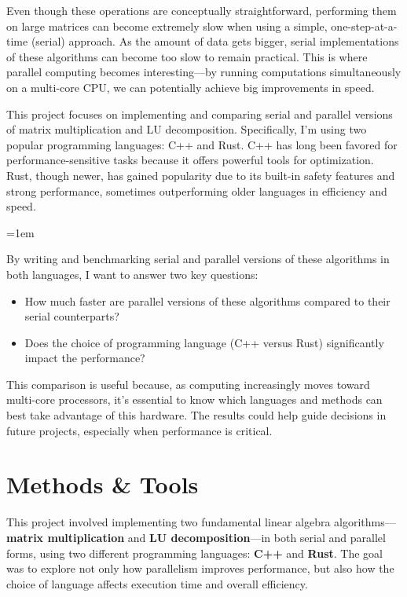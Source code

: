 \documentclass[12pt]{article}
\begin{document}
\vspace{1em}

Even though these operations are conceptually straightforward, performing them on large matrices can become extremely slow when using a simple,
one-step-at-a-time (serial) approach. As the amount of data gets bigger, serial implementations of these algorithms can become too slow to remain practical. This is
where parallel computing becomes interesting---by running computations simultaneously on a multi-core CPU, we can potentially
achieve big improvements in speed.

\vspace{1em}

This project focuses on implementing and comparing serial and parallel versions of matrix multiplication and LU decomposition. Specifically,
I'm using two popular programming languages: C++ and Rust. C++ has long been favored for performance-sensitive tasks because it offers powerful
tools for optimization. Rust, though newer, has gained popularity due to its built-in safety features and strong performance, sometimes outperforming
older languages in efficiency and speed.

\parskip=1em

By writing and benchmarking serial and parallel versions of these algorithms in both languages, I want to answer two key questions:

\begin{itemize}
    \item How much faster are parallel versions of these algorithms compared to their serial counterparts?
    \item Does the choice of programming language (C++ versus Rust) significantly impact the performance?
\end{itemize}

This comparison is useful because, as computing increasingly moves toward multi-core processors, it's essential to know which languages and methods can
best take advantage of this hardware. The results could help guide decisions in future projects, especially when performance is critical.


\section{Methods \& Tools}

This project involved implementing two fundamental linear algebra algorithms---\textbf{matrix multiplication} and \textbf{LU decomposition}---in both
serial and parallel forms, using two different programming languages: \textbf{C++} and \textbf{Rust}. The goal was to explore not only how parallelism
improves performance, but also how the choice of language affects execution time and overall efficiency.
\end{document}
